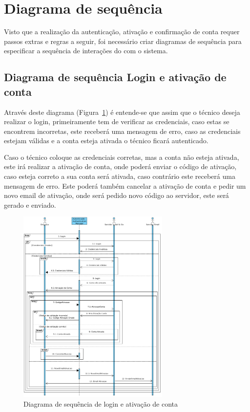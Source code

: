 \newpage

\section{Diagrama de sequência}

Visto que a realização da autenticação, ativação e confirmação de conta requer passos extras e regras a seguir, 
foi necessário criar diagramas de sequência para especificar a sequência de interações do com o sistema.

\subsection{Diagrama de sequência Login e ativação de conta}

Através deste diagrama (Figura~\ref{fig:30}) é entende-se que assim que o técnico deseja realizar o 
login, primeiramente tem de verificar as credenciais, caso estas se encontrem incorretas, este receberá 
uma mensagem de erro, caso as credenciais estejam válidas e a conta esteja ativada o técnico ficará 
autenticado. 

Caso o técnico coloque as credenciais corretas, mas a conta não esteja ativada, este irá realizar a 
ativação de conta, onde poderá enviar o código de ativação, caso esteja correto a sua conta será 
ativada, caso contrário este receberá uma mensagem de erro. Este poderá também cancelar a 
ativação de conta e pedir um novo email de ativação, onde será pedido novo código ao servidor, 
este será gerado e enviado.

\begin{figure}[htb]
    \centering
    \includegraphics[width=0.67\textwidth]{images/diagramas/sequencia/diagrama_login.png}
    \caption{Diagrama de sequência de login e ativação de conta}
    \label{fig:30}
\end{figure}

